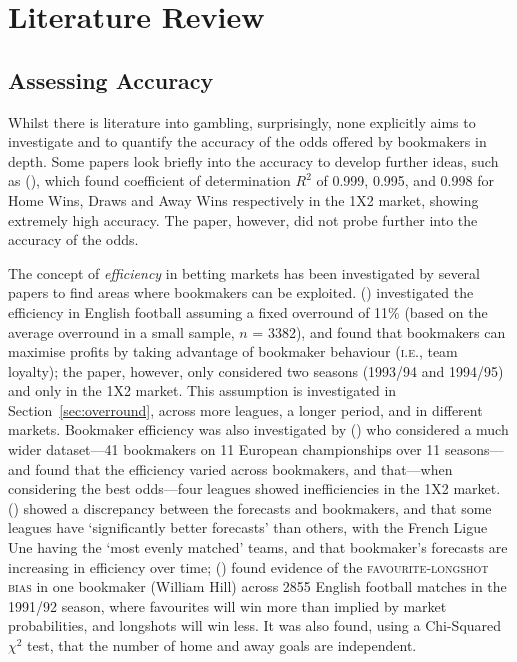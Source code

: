 \documentclass[a4paper,10pt]{report}
\begin{document}
\section{Literature Review} \label{sec:litrev}

\subsection*{Assessing Accuracy}
Whilst there is literature into gambling, surprisingly, none explicitly aims to investigate and to quantify the accuracy of the odds offered by bookmakers in depth. Some papers look briefly into the accuracy to develop further ideas, such as \citeauthor{kaunitz17} (\citeyear{kaunitz17}), which found coefficient of determination $R^2$ of 0.999, 0.995, and 0.998 for Home Wins, Draws and Away Wins respectively in the 1X2 market, showing extremely high accuracy. The paper, however, did not probe further into the accuracy of the odds. \vspace{3mm}

The concept of \textit{efficiency} in betting markets has been investigated by several papers to find areas where bookmakers can be exploited. \citeauthor{kuypers00} (\citeyear{kuypers00}) investigated the efficiency in English football assuming a fixed overround of 11\% (based on the average overround in a small sample, $n$ = 3382), and found that bookmakers can maximise profits by taking advantage of bookmaker behaviour (\textsc{i.e.}, team loyalty); the paper, however, only considered two seasons (1993/94 and 1994/95) and only in the 1X2 market. This assumption is investigated in Section~\ref{sec:overround}, across more leagues, a longer period, and in different markets. Bookmaker efficiency was also investigated by \citeauthor{angelini19} (\citeyear{angelini19}) who considered a much wider dataset---41 bookmakers on 11 European championships over 11 seasons---and found that the efficiency varied across bookmakers, and that---when considering the best odds---four leagues showed inefficiencies in the 1X2 market. \citeauthor{strumbelj10} (\citeyear{strumbelj10}) showed a discrepancy between the forecasts and bookmakers, and that some leagues have `significantly better forecasts' than others, with the French Ligue Une having the `most evenly matched' teams, and that bookmaker's forecasts are increasing in efficiency over time; \citeauthor{cain00} (\citeyear{cain00}) found evidence of the \textsc{favourite-longshot bias} in one bookmaker (William Hill) across 2855 English football matches in the 1991/92 season, where favourites will win more than implied by market probabilities, and longshots will win less. It was also found, using a Chi-Squared $\chi^2$ test, that the number of home and away goals are independent.\vspace{3mm}
\end{document}
